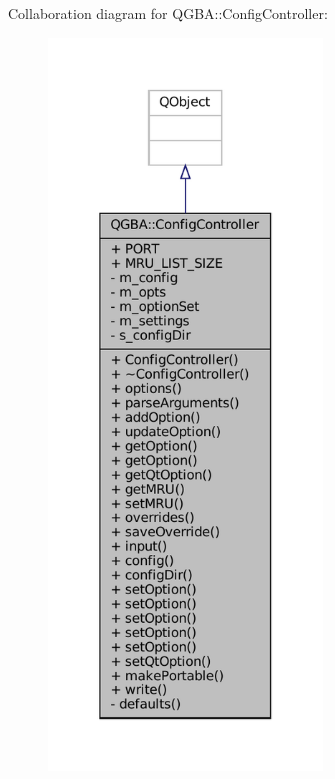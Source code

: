 Collaboration diagram for Q\+G\+BA\+:\+:Config\+Controller\+:
\nopagebreak
\begin{figure}[H]
\begin{center}
\leavevmode
\includegraphics[height=550pt]{class_q_g_b_a_1_1_config_controller__coll__graph}
\end{center}
\end{figure}
